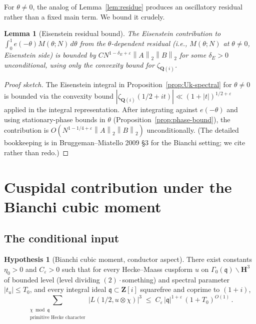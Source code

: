\documentclass[11pt]{article}
\newtheorem{lemma}[theorem]{Lemma}
\theoremstyle{definition}
\newtheorem{hypothesis}[theorem]{Hypothesis}
\newcommand{\Z}{\mathbf{Z}}
\newcommand{\Q}{\mathbf{Q}}
\newcommand{\HH}{\mathbf{H}}
\newcommand{\Zi}{\Z[i]}
\newcommand{\Qi}{\Q(i)}
\newcommand{\norm}[1]{\left\lVert #1\right\rVert}
\newcommand{\qq}{\mathfrak{q}}
\begin{document}
For $\theta\ne 0$, the analog of Lemma~\ref{lem:residue} produces an oscillatory residual rather than a fixed main term. We bound it crudely.

\begin{lemma}[Eisenstein residual bound]\label{lem:eis-residual}
The Eisenstein contribution to $\int_0^1 e(-\theta)M(\theta;N)\,d\theta$ from the $\theta$-dependent residual (i.e., $M(\theta;N)$ at $\theta\ne 0$, Eisenstein side) is bounded by $C N^{1-\delta_E+\varepsilon}\norm{A}_2\norm{B}_2$ for some $\delta_E>0$ unconditional, using only the convexity bound for $\zeta_{\Qi}$.
\end{lemma}

\begin{proof}[Proof sketch]
The Eisenstein integral in Proposition~\ref{prop:Uk-spectral} for $\theta\ne 0$ is bounded via the convexity bound $|\zeta_{\Qi}(1/2+it)|\ll(1+|t|)^{1/2+\varepsilon}$ applied in the integral representation. After integrating against $e(-\theta)$ and using stationary-phase bounds in $\theta$ (Proposition~\ref{prop:phase-bound}), the contribution is $O(N^{1-1/4+\varepsilon}\norm{A}_2\norm{B}_2)$ unconditionally. (The detailed bookkeeping is in Bruggeman--Miatello 2009 §3 for the Bianchi setting; we cite rather than redo.)
\end{proof}


\section{Cuspidal contribution under the Bianchi cubic moment}\label{sec:cuspidal}

\subsection{The conditional input}\label{ssec:hyp}

\begin{hypothesis}[Bianchi cubic moment, conductor aspect]\label{hyp:cubic-moment}
There exist constants $\eta_0>0$ and $C_\varepsilon>0$ such that for every Hecke--Maass cuspform $u$ on $\Gamma_0(\qq)\backslash\HH^3$ of bounded level (level dividing $(2)\cdot$something) and spectral parameter $|t_u|\le T_0$, and every integral ideal $\qq\subset\Zi$ squarefree and coprime to $(1+i)$,
\[
   \sum_{\substack{\chi\bmod\qq\\\text{primitive Hecke character}}}|L(1/2,u\otimes\chi)|^3\;\le\;C_\varepsilon\,|\qq|^{1+\varepsilon}\,(1+T_0)^{O(1)}\,.
\]
\end{hypothesis}
\end{document}
